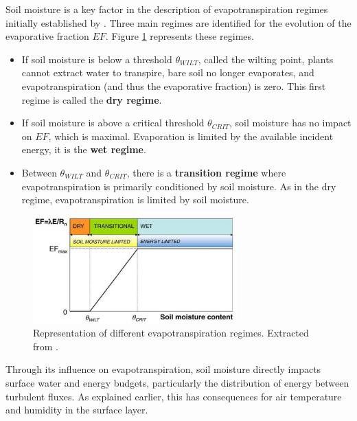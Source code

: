 Soil moisture is a key factor in the description of evapotranspiration regimes initially established by \citet{Budyko_1956, Budyko_1974}. Three main regimes are identified for the evolution of the evaporative fraction $EF$. Figure \ref{fig:evap_regimes} represents these regimes.

\begin{itemize}
    \item If soil moisture is below a threshold $\theta_{WILT}$, called the wilting point, plants cannot extract water to transpire, bare soil no longer evaporates, and evapotranspiration (and thus the evaporative fraction) is zero. This first regime is called the \textbf{dry regime}.
    \item If soil moisture is above a critical threshold $\theta_{CRIT}$, soil moisture has no impact on $EF$, which is maximal. Evaporation is limited by the available incident energy, it is the \textbf{wet regime}.
    \item Between $\theta_{WILT}$ and $\theta_{CRIT}$, there is a \textbf{transition regime} where evapotranspiration is primarily conditioned by soil moisture. As in the dry regime, evapotranspiration is limited by soil moisture.
\end{itemize}

\begin{figure}[ht]
    \centering
    \includegraphics[width=0.7\textwidth]{images/evap_regimes.png}
    \caption{Representation of different evapotranspiration regimes. Extracted from \citet{seneviratne_investigating_2010}.}
    \label{fig:evap_regimes}
\end{figure}

Through its influence on evapotranspiration, soil moisture directly impacts surface water and energy budgets, particularly the distribution of energy between turbulent fluxes. As explained earlier, this has consequences for air temperature and humidity in the surface layer.

